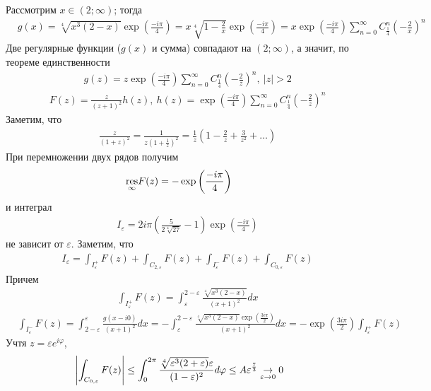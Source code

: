 Рассмотрим $x \in (2; \infty)$; тогда
\begin{align*}
  & g(x) = \sqrt[4]{x^3(2-x)}\exp\left( \frac{-i\pi}{4} \right) = x\sqrt[4]{1-\frac{2}{x}}\exp \left( \frac{-i\pi}{4} \right) = x\exp\left( \frac{-i\pi}{4} \right)\sum_{n=0}^\infty C_{\frac{1}{4}}^n\left( -\frac{2}{x} \right)^n
\end{align*}
Две регулярные функции ($g(x)$ и сумма) совпадают на $(2; \infty)$, а значит, по
теореме единственности
\begin{align*}
  & g(z) = z\exp\left( \frac{-i\pi}{4} \right)\sum_{n=0}^\infty C_{\frac{1}{4}}^n\left( -\frac{2}{z} \right)^n, \ \left| z \right|> 2
\end{align*}
\begin{align*}
  & F(z) = \frac{z}{(z+1)^2}h(z), \ h(z) = \exp\left( \frac{-i\pi}{4} \right)\sum_{n=0}^\infty C_{\frac{1}{4}}^n\left( -\frac{2}{z} \right)^n
\end{align*}
Заметим, что
\begin{align*}
  & \frac{z}{(1+z)^2} = \frac{1}{z(1+\frac{1}{z})^2} = \frac{1}{z} \left( 1-\frac{2}{z} +\frac{3}{z^2} + \dots \right)
\end{align*}
При перемножении двух рядов получим
\begin{align*}
  & \underset{\infty}{\mathrm{res}}F(z) = -\exp\left( \frac{-i\pi}{4} \right)
\end{align*}
и интеграл
\begin{align*}
  & I_\varepsilon = 2 i \pi \left( \frac{5}{2\sqrt[4]{27}} - 1 \right)\exp\left( \frac{-i\pi}{4} \right)
\end{align*}
не зависит от $\varepsilon$. Заметим, что
\begin{align*}
  & I_\varepsilon = \int_{I_\varepsilon^+}F(z) + \int_{C_{2, \varepsilon}}F(z) + \int_{I_\varepsilon^-}F(z) + \int_{C_{0, \varepsilon}}F(z)
\end{align*}
Причем
\begin{align*}
  & \int_{I_\varepsilon^+}F(z) = \int_{\varepsilon}^{2-\varepsilon}\frac{\sqrt[4]{x^3(2-x)}}{(x+1)^2}dx
\end{align*}
\begin{align*}
  & \int_{I_\varepsilon^-}F(z) = \int_{2-\varepsilon}^{\varepsilon}\frac{g(x-i0)}{(x+1)^2}dx = -\int_{\varepsilon}^{2-\varepsilon}\frac{\sqrt[4]{x^3(2-x)}\exp\left( \frac{3i\pi}{2} \right)}{(x+1)^2}dx = -\exp\left( \frac{3i\pi}{2}\right) \int_{I_\varepsilon^+}F(z)
\end{align*}
Учтя $z = \varepsilon e^{i \varphi}$,
\begin{align*}
  & \left|  \int_{C_{0, \varepsilon}}F(z) \right| \leq \int_{0}^{2 \pi}\frac{\sqrt[4]{\varepsilon^3(2+\varepsilon)}\varepsilon}{(1-\varepsilon)^2}d\varphi \leq A\varepsilon^{\frac{7}{3}} \underset{\varepsilon \to 0}{\to} 0
\end{align*}
